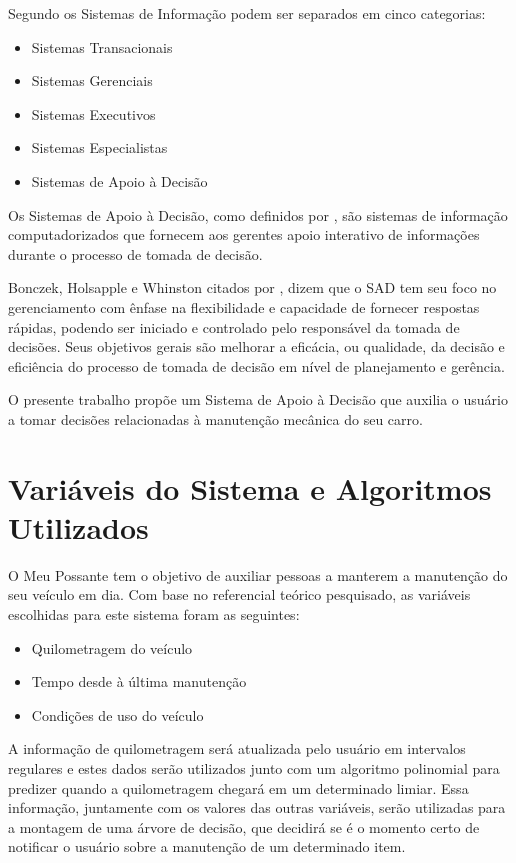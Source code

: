\documentclass[12pt]{article}
\begin{document}
Segundo  os Sistemas de Informação podem ser
separados em cinco categorias:

\begin{itemize}
    \item Sistemas Transacionais
    \item Sistemas Gerenciais
    \item Sistemas Executivos
    \item Sistemas Especialistas
    \item Sistemas de Apoio à Decisão
\end{itemize}

Os Sistemas de Apoio à Decisão, como definidos por ,
são sistemas de informação computadorizados que fornecem aos gerentes apoio
interativo de informações durante o processo de tomada de decisão.

Bonczek, Holsapple e Whinston citados por , dizem que
o SAD tem seu foco no gerenciamento com ênfase na flexibilidade e capacidade de
fornecer respostas rápidas, podendo ser iniciado e controlado pelo responsável
da tomada de decisões. Seus objetivos gerais são melhorar a eficácia, ou
qualidade, da decisão e eficiência do processo de tomada de decisão em nível de
planejamento e gerência.

O presente trabalho propõe um Sistema de Apoio à Decisão que auxilia o usuário
a tomar decisões relacionadas à manutenção mecânica do seu carro.

\section{Variáveis do Sistema e Algoritmos Utilizados} \label{sec:algoritmos}
O Meu Possante tem o objetivo de auxiliar pessoas a manterem a manutenção do seu
veículo em dia. Com base no referencial teórico pesquisado, as variáveis
escolhidas para este sistema foram as seguintes:

\begin{itemize}
    \item Quilometragem do veículo
    \item Tempo desde à última manutenção
    \item Condições de uso do veículo
\end{itemize}

A informação de quilometragem será atualizada pelo usuário em intervalos
regulares e estes dados serão utilizados junto com um algoritmo polinomial
para predizer quando a quilometragem chegará em um determinado limiar. Essa
informação, juntamente com os valores das outras variáveis, serão utilizadas
para a montagem de uma árvore de decisão, que decidirá se é o momento certo de
notificar o usuário sobre a manutenção de um determinado item.
\end{document}
